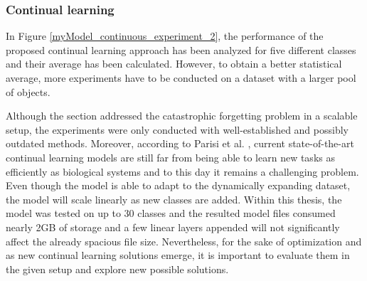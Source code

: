 \subsubsection{Continual learning}
In Figure \ref{myModel_continuous_experiment_2}, the performance of the proposed continual learning approach has been analyzed for five different classes and their average has been calculated. However, to obtain a better statistical average, more experiments have to be conducted on a dataset with a larger pool of objects. 

Although the  section addressed the catastrophic forgetting problem in a scalable setup, the experiments were only conducted with well-established and possibly outdated methods. Moreover, according to Parisi et al. \cite{Parisi2018}, current state-of-the-art continual learning models are still far from being able to learn new tasks as efficiently as biological systems and to this day it remains a challenging problem. Even though the model is able to adapt to the dynamically expanding dataset, the model will scale linearly as new classes are added. Within this thesis, the model was tested on up to 30 classes and the resulted model files consumed nearly 2GB of storage and a few linear layers appended will not significantly affect the already spacious file size. Nevertheless, for the sake of optimization and as new continual learning solutions emerge, it is important to evaluate them in the given setup and explore new possible solutions. 




\clearpage